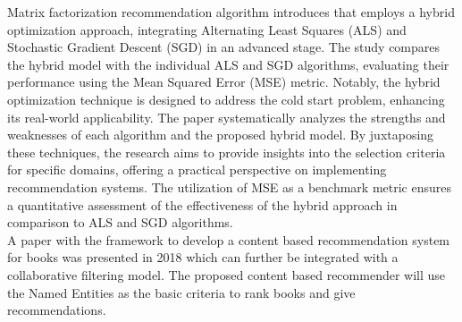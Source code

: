 Matrix factorization recommendation algorithm \cite{article1} introduces  that employs a hybrid optimization approach, integrating Alternating Least Squares (ALS) and Stochastic Gradient Descent (SGD) in an advanced stage. The study compares the hybrid model with the individual ALS and SGD algorithms, evaluating their performance using the Mean Squared Error (MSE) metric. Notably, the hybrid optimization technique is designed to address the cold start problem, enhancing its real-world applicability. The paper systematically analyzes the strengths and weaknesses of each algorithm and the proposed hybrid model. By juxtaposing these techniques, the research aims to provide insights into the selection criteria for specific domains, offering a practical perspective on implementing recommendation systems. The utilization of MSE as a benchmark metric ensures a quantitative assessment of the effectiveness of the hybrid approach in comparison to ALS and SGD algorithms. 
\\
A paper with the framework to develop a
content based recommendation system  \cite{article4}for books was presented in 2018 which can further be integrated with a
collaborative filtering model. The proposed content based recommender will use the Named Entities as the basic criteria to rank books and give recommendations.
\\

